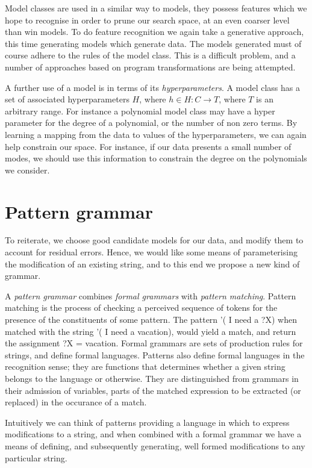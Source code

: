 Model classes are used in a similar way to models, they possess features which we hope to recognise in order to prune our search space, at an even coarser level than win models.
To do feature recognition we again take a generative approach, this time generating models which generate data.
The models generated must of course adhere to the rules of the model class.
This is a difficult problem, and a number of approaches based on program transformations are being attempted.

A further use of a model is in terms of its \textit{hyperparameters}.
A model class has a set of associated hyperparameters $H$, where $h \in H: C \rightarrow T$, where $T$ is an arbitrary range.
For instance a polynomial model class may have a hyper parameter for the degree of a polynomial, or the number of non zero terms.
By learning a mapping from the data to values of the hyperparameters, we can again help constrain our space.
For instance, if our data presents a small number of modes, we should use this information to constrain the degree on the polynomials we consider.

\section{Pattern grammar}

To reiterate, we choose good candidate models for our data, and modify them to account for residual errors.
Hence, we would like some means of parameterising the modification of an existing string, and to this end we propose a new kind of grammar.

A \textit{pattern grammar} combines {\em formal grammars} with {\em pattern matching}.
Pattern matching is the process of checking a perceived sequence of tokens for the presence of the constituents of some pattern.
The pattern '( I need a ?X) when matched with the string '( I need a vacation), would yield a match, and return the assignment ?X = vacation.
Formal grammars are sets of production rules for strings, and define formal languages.
Patterns also define formal languages in the recognition sense; they are functions that determines whether a given string belongs to the language or otherwise.
They are distinguished from grammars in their admission of variables, parts of the matched expression to be extracted (or replaced) in the occurance of a match.

Intuitively we can think of patterns  providing a language in which to express modifications to a string, and when combined with a formal grammar we have a means of defining, and subsequently generating, well formed modifications to any particular string.

